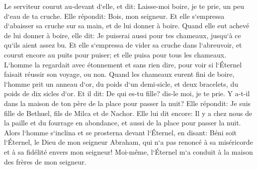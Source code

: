 \verse Le serviteur courut au-devant d`elle, et dit: Laisse-moi boire, je te prie, un peu d`eau de ta cruche. 
\verse Elle répondit: Bois, mon seigneur. Et elle s`empressa d`abaisser sa cruche sur sa main, et de lui donner à boire. 
\verse Quand elle eut achevé de lui donner à boire, elle dit: Je puiserai aussi pour tes chameaux, jusqu`à ce qu`ils aient assez bu. 
\verse Et elle s`empressa de vider sa cruche dans l`abreuvoir, et courut encore au puits pour puiser; et elle puisa pour tous les chameaux. 
\verse L`homme la regardait avec étonnement et sans rien dire, pour voir si l`Éternel faisait réussir son voyage, ou non. 
\verse Quand les chameaux eurent fini de boire, l`homme prit un anneau d`or, du poids d`un demi-sicle, et deux bracelets, du poids de dix sicles d`or. 
\verse Et il dit: De qui es-tu fille? dis-le moi, je te prie. Y a-t-il dans la maison de ton père de la place pour passer la nuit? 
\verse Elle répondit: Je suis fille de Bethuel, fils de Milca et de Nachor. 
\verse Elle lui dit encore: Il y a chez nous de la paille et du fourrage en abondance, et aussi de la place pour passer la nuit. 
\verse Alors l`homme s`inclina et se prosterna devant l`Éternel, 
\verse en disant: Béni soit l`Éternel, le Dieu de mon seigneur Abraham, qui n`a pas renoncé à sa miséricorde et à sa fidélité envers mon seigneur! Moi-même, l`Éternel m`a conduit à la maison des frères de mon seigneur. 
